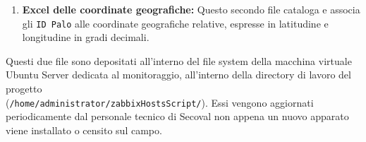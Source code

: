 \documentclass[12pt, a4paper, oneside]{report}
\begin{document}
\begin{enumerate}
\begin{table}[ht]
{\begin{tabular}{llllllllllllcll}
                      \bottomrule
                  \end{tabular}%
              }
              \caption{Tabella Excel degli asset(dati sensibili offuscati)}
              \label{tab:ExcelAsset}
          \end{table}
    \item \textbf{Excel delle coordinate geografiche:} Questo secondo file cataloga e associa gli \texttt{ID Palo} alle coordinate geografiche relative, espresse in latitudine e longitudine in gradi decimali.
          \begin{table}[ht]
              \centering
              \caption{Tabella Excel delle coordinate geografiche(dati sensibili offuscati)}
              \label{tab:ExcelCoordinate}
          \end{table}
\end{enumerate}

Questi due file sono depositati all'interno del file system della macchina virtuale Ubuntu Server dedicata al monitoraggio, all'interno della directory di lavoro del progetto \\(\texttt{/home/administrator/zabbixHostsScript/}). Essi vengono aggiornati periodicamente dal personale tecnico di Secoval non appena un nuovo apparato viene installato o censito sul campo.
\end{document}
